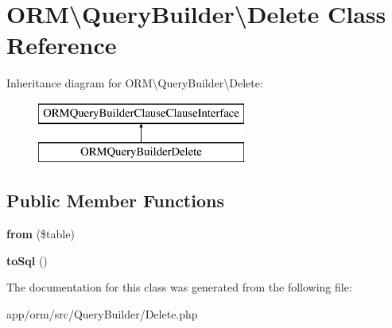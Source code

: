 \hypertarget{classORM_1_1QueryBuilder_1_1Delete}{}\section{O\+RM\textbackslash{}Query\+Builder\textbackslash{}Delete Class Reference}
\label{classORM_1_1QueryBuilder_1_1Delete}
Inheritance diagram for O\+RM\textbackslash{}Query\+Builder\textbackslash{}Delete\+:\begin{figure}[H]
\begin{center}
\leavevmode
\includegraphics[height=2.000000cm]{classORM_1_1QueryBuilder_1_1Delete}
\end{center}
\end{figure}
\subsection*{Public Member Functions}
\begin{DoxyCompactItemize}
\item 
{\bfseries from} (\$table)\hypertarget{classORM_1_1QueryBuilder_1_1Delete_a63edd9e626091ac44900e3d0b99e78be}{}\label{classORM_1_1QueryBuilder_1_1Delete_a63edd9e626091ac44900e3d0b99e78be}

\item 
{\bfseries to\+Sql} ()\hypertarget{classORM_1_1QueryBuilder_1_1Delete_a775f46779766b6c8360cc1da938116f8}{}\label{classORM_1_1QueryBuilder_1_1Delete_a775f46779766b6c8360cc1da938116f8}

\end{DoxyCompactItemize}


The documentation for this class was generated from the following file\+:\begin{DoxyCompactItemize}
\item 
app/orm/src/\+Query\+Builder/Delete.\+php\end{DoxyCompactItemize}
